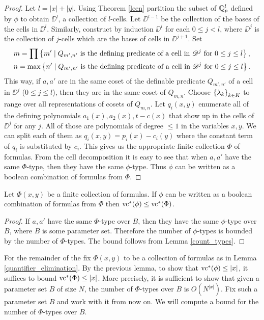 \begin{proof}
  Let $l = |x| + |y|$.
  Using Theorem \ref{leen} partition the subset of $\mathbb{Q}_p^l$ defined by $\phi$ to obtain $\DD^l$, a collection of $l$-cells.
  Let $\DD^{l-1}$ be the collection of the bases of the cells in $\DD^l$.
  Similarly, construct by induction $\DD^i$ for each $0 \leq j < l$,
  where $\DD^j$ is the collection of $j$-cells which are the bases of cells in $\DD^{j+1}$.
  Set
  \begin{align*}
    &m = \prod \left\{m' \mid Q_{m',n'} \text{ is the defining predicate of a cell in $\mathscr D^j$ for $0 \leq j \leq l$} \right\}, \\
    &n = \max \left\{n' \mid Q_{m',n'} \text{ is the defining predicate of a cell in $\mathscr D^j$ for $0 \leq j \leq l$} \right\}.
  \end{align*}
  This way, if $a, a'$ are in the same coset of the definable predicate
  $Q_{m',n'}$ of a cell in $\DD^j$ ($0 \leq j \leq l$),
  then they are in the same coset of $Q_{m,n}$.
  Choose $\left\{\lambda_k\right\}_{k \in K}$ to range over all representations of cosets of $Q_{m,n}$.
  Let $q_i(x, y)$ enumerate all of the defining polynomials $a_1(x), a_2(x), t - c(x)$ that show up in the cells of $\DD^j$ for any $j$.
  All of those are polynomials of degree $\leq 1$ in the variables $x, y$.
  We can split each of them as $q_i(x,y) = p_i(x) - c_i(y)$ where the constant term of $q_i$ is substituted by $c_i$.
  This gives us the appropriate finite collection $\Phi$ of formulas.
  From the cell decomposition it is easy to see that when $a, a'$ have the same $\Phi$-type,
  then they have the same $\phi$-type.
  Thus $\phi$ can be written as a boolean combination of formulas from $\Phi$.
\end{proof}

\begin{Lemma}
  Let $\Phi(x, y)$ be a finite collection of formulas.
  If $\phi$ can be written as a boolean combination of formulas from $\Phi$ then $\operatorname{vc}^* (\phi) \leq \operatorname{vc}^* (\Phi)$.
\end{Lemma}
\begin{proof}
  If $a,a'$ have the same $\Phi$-type over $B$, then they have the same $\phi$-type over $B$, where $B$ is some parameter set.
  Therefore the number of $\phi$-types is bounded by the number of $\Phi$-types.
  The bound follows from Lemma \ref{count_types}.
\end{proof}

For the remainder of the \chapa fix $\Phi(x, y)$ to be a collection of formulas as in Lemma \ref{quantifier_elimination}.
By the previous lemma, to show that $\operatorname{vc}^*(\phi) \leq |x|$, it suffices to bound $\operatorname{vc}^*(\Phi) \leq |x|$.
More precisely, it is sufficient to show that given a parameter set $B$ of size $N$,
the number of $\Phi$-types over $B$ is $O(N^{|x|})$.
Fix such a parameter set $B$ and work with it from now on.
We will compute a bound for the number of $\Phi$-types over $B$.

